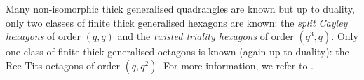 \documentclass[12pt]{article}
\newtheorem{theorem}{Theorem}
\newtheorem{definition}{Definition}
\theoremstyle{remark}
\begin{document}
Many non-isomorphic thick generalised quadrangles are known but up to duality, only two classes of finite thick generalised hexagons are known: the \emph{split Cayley hexagons} of order \((q,q)\) and the \emph{twisted triality hexagons} of order \((q^3,q)\). Only one class of finite thick generalised octagons is known (again up to duality): the Ree-Tits octagons of order \((q,q^2)\). 
For more information, we refer to \cite{Hendrik}.






\end{document}
